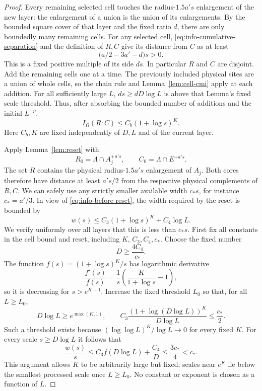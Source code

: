 \begin{proof}
Every remaining selected cell touches the radius-$1.5a's$ enlargement
of the new layer: the enlargement of a union is the union of its
enlargements.  By the bounded square cover of that layer and the fixed
ratio $d$, there are only boundedly many remaining cells.  For any
selected cell, \eqref{eq:info-cumulative-separation} and the definition
of $R,C$ give its distance from $C$ as at least
\begin{equation}
 \bigl(a/2-3a'-d\bigr)s>0.
 \label{eq:info-cell-clearance}
\end{equation}
This is a fixed positive multiple of its side $ds$.  In particular
$R$ and $C$ are disjoint.  Add the remaining cells one at a time.
The previously included physical sites are a union of whole cells,
so the chain rule and Lemma~\ref{lem:cell-cmi} apply at each addition.
For all sufficiently large $L$, $ds\ge dD\log L$ is above that
Lemma's fixed scale threshold.  Thus, after absorbing the bounded
number of additions and the initial $L^{-p}$,
\begin{equation}
 I_\Omega(R:C)\le C_b(1+\log s)^K.
 \label{eq:info-before-reset}
\end{equation}
Here $C_b,K$ are fixed independently of $D,L$ and of the current layer.

Apply Lemma~\ref{lem:reset} with
\[
 R_0=\Lambda\cap A_j^{+a's},\qquad C_0=\Lambda\cap E^{+a's}.
\]
The set $R$ contains the physical radius-$1.5a's$ enlargement of
$A_j$.  Both cores therefore have distance at least $a's/2$ from
the respective physical complements of $R,C$.  We can safely use
any strictly smaller available width $c_*s$, for instance $c_*=a'/3$.
In view of \eqref{eq:info-before-reset}, the width required by the
reset is bounded by
\begin{equation}
 w(s)\le C_3(1+\log s)^K+C_4\log L.
 \label{eq:info-reset-scale-cost}
\end{equation}
We verify uniformly over all layers that this is less than $c_*s$.
First fix all constants in the cell bound and reset, including $K$,
$C_3,C_4,c_*$.  Choose the fixed number
\[
 D\ge\frac{4C_4}{c_*}.
\]
The function $f(s)=(1+\log s)^K/s$ has logarithmic derivative
\[
 \frac{f'(s)}{f(s)}
     =\frac1s\left(\frac K{1+\log s}-1\right),
\]
so it is decreasing for $s>e^{K-1}$.  Increase the fixed threshold
$L_0$ so that, for all $L\ge L_0$,
\[
 D\log L\ge e^{\max(K,1)},\qquad
 C_3\frac{(1+\log(D\log L))^K}{D\log L}\le\frac{c_*}{2}.
\]
Such a threshold exists because
$(\log\log L)^K/\log L\to0$ for every fixed $K$.
For every scale $s\ge D\log L$ it follows that
\[
 \frac{w(s)}s
 \le C_3 f(D\log L)+\frac{C_4}{D}
 \le\frac{3c_*}{4}<c_*.
\]
This argument allows $K$ to be arbitrarily large but fixed; scales near
$e^K$ lie below the smallest processed scale once $L\ge L_0$.  No
constant or exponent is chosen as a function of $L$.


\end{proof}
